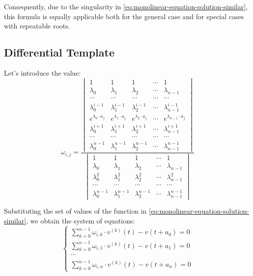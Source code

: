 \documentclass[a4paper, 11pt, oneside]{book}
\begin{document}
Consequently, due to the singularity in \ref{eq:monolinear-equation-solution-similar}, this formula is equally applicable both for the general case and for special cases with repeatable roots.

\subsection{Differential Template}
Let's introduce the value:
\begin{equation}\label{eq:det-division-as-omega}
  \omega_{i, j} = \frac{
  \begin{vmatrix}
    1 & 1 & 1 & \cdots & 1 \\
    \lambda_0 & \lambda_1 & \lambda_2 & \cdots & \lambda_{n-1} \\
    \cdots & \cdots & \cdots & \cdots & \cdots \\
    \lambda_0^{i-1} & \lambda_1^{i-1} & \lambda_2^{i-1} & \cdots & \lambda_{n-1}^{i-1} \\
    e^{\lambda_0 \cdot a_j} & e^{\lambda_1 \cdot a_j} & e^{\lambda_2 \cdot a_j} & \cdots & e^{\lambda_{n-1} \cdot a_j} \\
    \lambda_0^{i+1} & \lambda_1^{i+1} & \lambda_2^{i+1} & \cdots & \lambda_{n-1}^{i+1} \\
    \cdots & \cdots & \cdots & \cdots & \cdots \\
    \lambda_0^{n-1} & \lambda_1^{n-1} & \lambda_2^{n-1} & \cdots & \lambda_{n-1}^{n-1}
  \end{vmatrix}
  }{
  \begin{vmatrix}
    1 & 1 & 1 & \cdots & 1 \\
    \lambda_0 & \lambda_1 & \lambda_2 & \cdots & \lambda_{n-1} \\
    \lambda_0^2 & \lambda_1^2 & \lambda_2^2 & \cdots & \lambda_{n-1}^2 \\
    \cdots & \cdots & \cdots & \cdots & \cdots \\
    \lambda_0^{n-1} & \lambda_1^{n-1} & \lambda_2^{n-1} & \cdots & \lambda_{n-1}^{n-1}
  \end{vmatrix}
  }
\end{equation}

Substituting the set of values of the function in \ref{eq:monolinear-equation-solution-similar}, we obtain the system of equations:
\begin{equation}\label{eq:monolinear-equation-SE-short-form}
  \begin{cases}
    \displaystyle \sum_{k=0}^{n-1}\omega_{i,0} \cdot v^{(k)}(t) - v(t + a_0) = 0 \\
    \displaystyle \sum_{k=0}^{n-1}\omega_{i,1} \cdot v^{(k)}(t) - v(t + a_1) = 0 \\
    \cdots \\
    \displaystyle \sum_{k=0}^{n-1}\omega_{i,n} \cdot v^{(k)}(t) - v(t + a_n) = 0
  \end{cases}
\end{equation}
\end{document}
